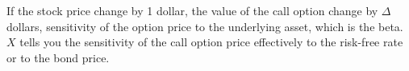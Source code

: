 \begin{multicols}{2}
If the stock price change by 1 dollar, the value of the call option change by $\Delta$ dollars, sensitivity of the option price to the underlying asset, which is the beta.
$X$ tells you the sensitivity of the call option price effectively to the risk-free rate or to the bond price.

\end{multicols}
